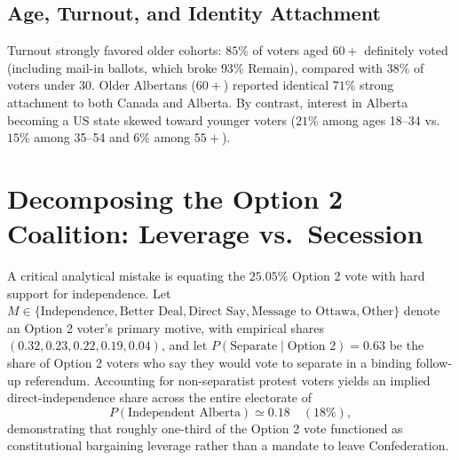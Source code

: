 \documentclass[11pt]{article}
\begin{document}
\subsection{Age, Turnout, and Identity Attachment}
Turnout strongly favored older cohorts: $85\%$ of voters aged $60+$ definitely voted (including mail-in ballots, which broke $93\%$ Remain), compared with $38\%$ of voters under $30$. Older Albertans ($60+$) reported identical $71\%$ strong attachment to both Canada and Alberta. By contrast, interest in Alberta becoming a US state skewed toward younger voters ($21\%$ among ages 18--34 vs.\ $15\%$ among 35--54 and $6\%$ among $55+$).

\section{Decomposing the Option 2 Coalition: Leverage vs.\ Secession}
\label{sec:coalition-math}
A critical analytical mistake is equating the $25.05\%$ Option 2 vote with hard support for independence. Let $M \in \{\text{Independence}, \text{Better Deal}, \text{Direct Say}, \text{Message to Ottawa}, \text{Other}\}$ denote an Option 2 voter's primary motive, with empirical shares $(0.32, 0.23, 0.22, 0.19, 0.04)$, and let $P(\text{Separate} \mid \text{Option 2}) = 0.63$ be the share of Option 2 voters who say they would vote to separate in a binding follow-up referendum. Accounting for non-separatist protest voters yields an implied direct-independence share across the entire electorate of
\begin{equation}
P(\text{Independent Alberta}) \simeq 0.18 \quad (18\%),
\label{eq:direct-independence}
\end{equation}
demonstrating that roughly one-third of the Option 2 vote functioned as constitutional bargaining leverage rather than a mandate to leave Confederation.
\end{document}
